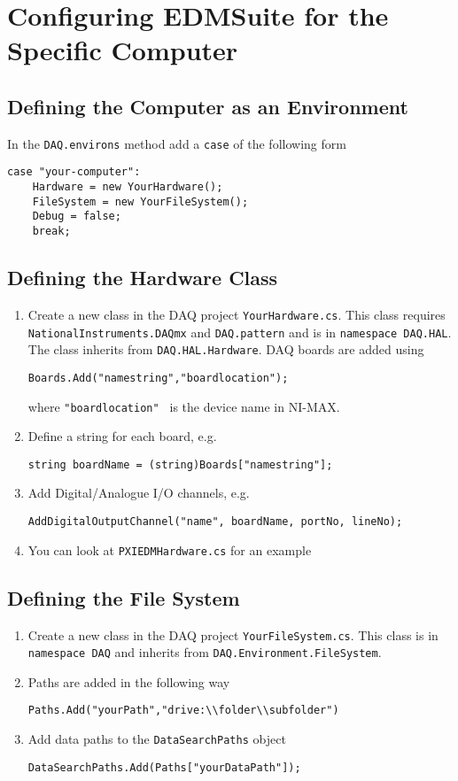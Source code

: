\documentclass{article}
\begin{document}
\section{Configuring EDMSuite for the Specific Computer}
\subsection{Defining the Computer as an Environment}
In the \lstinline|DAQ.environs| method add a \lstinline|case| of the following form
\begin{lstlisting}
case "your-computer":
	Hardware = new YourHardware();
	FileSystem = new YourFileSystem();
	Debug = false;
	break;
\end{lstlisting}
\subsection{Defining the Hardware Class}
\begin{enumerate}
\item Create a new class in the DAQ project \lstinline|YourHardware.cs|. This class requires \lstinline|NationalInstruments.DAQmx| and \lstinline|DAQ.pattern| and is in  \lstinline|namespace DAQ.HAL|. The class inherits from \lstinline|DAQ.HAL.Hardware|. DAQ boards are added using
\begin{lstlisting}
Boards.Add("namestring","boardlocation");
\end{lstlisting}
where \lstinline|"boardlocation" | is the device name in NI-MAX. 
\item Define a string for each board, e.g.
\begin{lstlisting}
string boardName = (string)Boards["namestring"];
\end{lstlisting}
\item Add Digital/Analogue I/O channels, e.g.
\begin{lstlisting}
AddDigitalOutputChannel("name", boardName, portNo, lineNo);
\end{lstlisting}
\item You can look at \lstinline|PXIEDMHardware.cs| for an example
\end{enumerate}
\subsection{Defining the File System}
\begin{enumerate}
\item Create a new class in the DAQ project \lstinline|YourFileSystem.cs|. This class is in \lstinline|namespace DAQ| and inherits from \lstinline|DAQ.Environment.FileSystem|.
\item Paths are added in the following way
\begin{lstlisting}
Paths.Add("yourPath","drive:\\folder\\subfolder")
\end{lstlisting}
\item Add data paths to the \lstinline|DataSearchPaths| object
\begin{lstlisting}
DataSearchPaths.Add(Paths["yourDataPath"]);
\end{lstlisting}
\end{enumerate}
\end{document}
